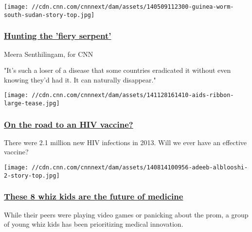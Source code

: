 \href{/2014/05/09/health/hunting-fiery-serpent-guinea-worm/index.html}{}

\texttt{[image: //cdn.cnn.com/cnnnext/dam/assets/140509112300-guinea-worm-south-sudan-story-top.jpg]}

\hypertarget{hunting-the-fiery-serpent}{%
\subsubsection{\texorpdfstring{\href{/2014/05/09/health/hunting-fiery-serpent-guinea-worm/index.html}{Hunting
the 'fiery
serpent'}}{Hunting the 'fiery serpent'}}\label{hunting-the-fiery-serpent}}

Meera Senthilingam, for CNN

"It's such a loser of a disease that some countries eradicated it
without even knowing they'd had it. It can naturally disappear."

\href{/2014/12/01/health/are-we-on-the-road-to-an-hiv-vaccine/index.html}{}

\texttt{[image: //cdn.cnn.com/cnnnext/dam/assets/141128161410-aids-ribbon-large-tease.jpg]}

\hypertarget{on-the-road-to-an-hiv-vaccine}{%
\subsubsection{\texorpdfstring{\href{/2014/12/01/health/are-we-on-the-road-to-an-hiv-vaccine/index.html}{On
the road to an HIV
vaccine?}}{On the road to an HIV vaccine?}}\label{on-the-road-to-an-hiv-vaccine}}

There were 2.1 million new HIV infections in 2013. Will we ever have an
effective vaccine?

\href{/2014/08/14/health/8-whiz-kids-future-medicine/index.html}{}

\texttt{[image: //cdn.cnn.com/cnnnext/dam/assets/140814100956-adeeb-alblooshi-2-story-top.jpg]}

\hypertarget{these-8-whiz-kids-are-the-future-of-medicine}{%
\subsubsection{\texorpdfstring{\href{/2014/08/14/health/8-whiz-kids-future-medicine/index.html}{These
8 whiz kids are the future of
medicine}}{These 8 whiz kids are the future of medicine}}\label{these-8-whiz-kids-are-the-future-of-medicine}}

While their peers were playing video games or panicking about the prom,
a group of young whiz kids has been prioritizing medical innovation.


